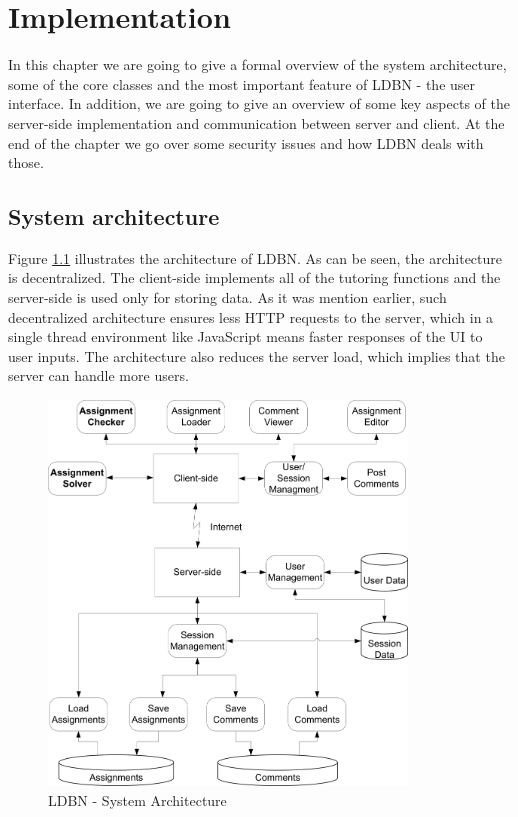 \chapter{Implementation}
\label{chap:impl}
In this chapter we are going to give a formal overview of the system architecture,
some of the core classes and the most important
feature of LDBN - the user interface. In addition, we are going to give an overview
of some key aspects of the server-side implementation and communication
between server and client. At the end of the chapter we go over some
security issues and how LDBN deals with those. 

\section{System architecture}
Figure \ref{fig:sysarch} illustrates the architecture of LDBN. 
As can be seen, the architecture is decentralized. The client-side implements 
all of the tutoring functions and the server-side is used only for storing data.
As it was mention earlier, such decentralized architecture ensures less HTTP requests to
the server, which in a single thread environment like JavaScript means faster 
responses of the UI to user inputs. The architecture also reduces the server load,
which implies that the server can handle more users.

\begin{figure}[h]
	\begin{center}
		\includegraphics[width=0.85\textwidth]{./img/architecture01.png}
		\caption{LDBN - System Architecture}
		\label{fig:sysarch}
	\end{center}
\end{figure}

